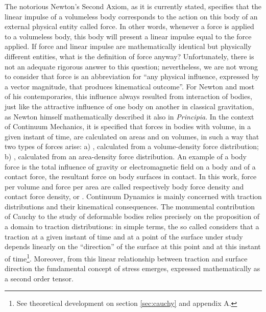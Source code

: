 The notorious Newton's Second Axiom, as it is currently stated, specifies that the linear impulse of a volumeless body corresponds to the action on this body of an external physical entity called force. In other words, whenever a force is applied to a volumeless body, this body will present a linear impulse equal to the force applied. If force and linear impulse are mathematically identical but physically different entities, what is the definition of force anyway?  Unfortunately, there is not an adequate rigorous answer to this question; nevertheless, we are not wrong to consider that force is an abbreviation for ``any physical influence, expressed by a vector magnitude, that produces kinematical outcome''. For Newton and most of his contemporaries, this influence always resulted from interaction of bodies, just like the attractive influence of one body on another in classical gravitation, as Newton himself mathematically described it also in \emph{Principia}. In the context of Continuum Mechanics, it is specified that forces in bodies with volume, in a given instant of time, are calculated on areas and on volumes, in such a way that two types of forces arise: a) , calculated from a volume-density force distribution; b) , calculated from an area-density force distribution. An example of a body force is the total influence of gravity or electromagnetic field on a body and of a contact force, the resultant force on body surfaces in contact. In this work, force per volume and force per area are called respectively body force density and contact force density, or . Continuum Dynamics is mainly concerned with traction distributions and their kinematical consequences. The monumental contribution of Cauchy to the study of deformable bodies relies precisely on the proposition of a domain to traction distributions: in simple terms, the so called  considers that a traction at a given instant of time and at a point of the surface under study depends linearly on the ``direction'' of the surface at this point and at this instant of time\footnote{See theoretical development on section \ref{sec:cauchy} and appendix A.}. Moreover, from this linear relationship between traction and surface direction the fundamental concept of stress emerges, expressed mathematically as a second order tensor.     



